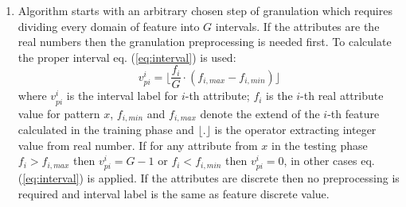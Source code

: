 \begin{enumerate}
    \item Algorithm starts with an arbitrary chosen step of granulation which
        requires dividing every domain of feature into $G$ intervals.
        If the attributes are the real numbers then the granulation preprocessing 
        is needed first. To calculate the proper interval eq. (\ref{eq:interval})
        is used:
        \begin{equation}
            v_{pi}^{i} = \lfloor \frac{f_{i}}{G}\cdot(f_{i,
            max}-f_{i,min})\rfloor
            \label{eq:interval}
        \end{equation}
        where $v_{pi}^{i}$ is the interval label for $i$-th attribute; $f_i$ is
        the $i$-th real attribute value for pattern $x$, $f_{i,min}$ and
        $f_{i,max}$ denote the extend of the $i$-th feature calculated in the
        training phase and $\lfloor . \rfloor$ is the operator extracting
        integer value from real number. If for any attribute from $x$ in the testing phase 
        $f_i > f_{i, max}$ then $v_{pi}^{i}=G-1$ or $f_i < f_{i, min}$ then
        $v_{pi}^{i}=0$, in other cases eq. (\ref{eq:interval}) is applied.
        If the attributes are discrete then no preprocessing is required and 
        interval label is the same as feature discrete value.


\end{enumerate}
